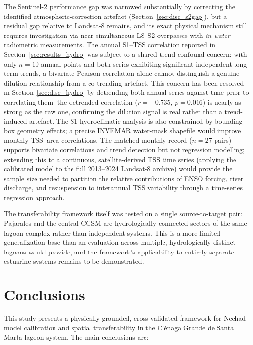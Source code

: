 \documentclass[remotesensing,article,submit,pdftex,moreauthors]{Definitions/mdpi}
\begin{document}
The Sentinel-2 performance gap was narrowed substantially by correcting
the identified atmospheric-correction artefact
(Section~\ref{sec:disc_s2gap}), but a residual gap relative to
Landsat-8 remains, and its exact physical mechanism still requires
investigation via near-simultaneous L8--S2 overpasses with
\textit{in-water} radiometric measurements. The annual S1--TSS
correlation reported in Section~\ref{sec:results_hydro} was subject to
a shared-trend confound concern: with only $n=10$ annual points and
both series exhibiting significant independent long-term trends, a
bivariate Pearson correlation alone cannot distinguish a genuine
dilution relationship from a co-trending artefact. This concern has
been resolved in Section~\ref{sec:disc_hydro} by detrending both
annual series against time prior to correlating them: the detrended
correlation ($r = -0.735$, $p = 0.016$) is nearly as strong as the
raw one, confirming the dilution signal is real rather than a
trend-induced artefact. The S1 hydroclimatic
analysis is also constrained by bounding box geometry effects; a precise
INVEMAR water-mask shapefile would improve monthly TSS--area
correlations. The matched monthly record ($n = 27$ pairs) supports
bivariate correlations and trend detection but not regression
modelling; extending this to a continuous, satellite-derived TSS time
series (applying the calibrated model to the full 2013--2024 Landsat-8
archive) would provide the sample size needed to partition the
relative contributions of ENSO forcing, river discharge, and
resuspension to interannual TSS variability through a time-series
regression approach.

The transferability framework itself was tested on a single
source-to-target pair: Pajarales and the central CGSM are
hydrologically connected sectors of the same lagoon complex rather
than independent systems. This is a more limited generalization base
than an evaluation across multiple, hydrologically distinct lagoons
would provide, and the framework's applicability to entirely separate
estuarine systems remains to be demonstrated.
 
 
\section{Conclusions}
 
This study presents a physically grounded, cross-validated framework
for Nechad model calibration and spatial transferability in the
Ci\'enaga Grande de Santa Marta lagoon system. The main conclusions
are:
 
\end{document}
